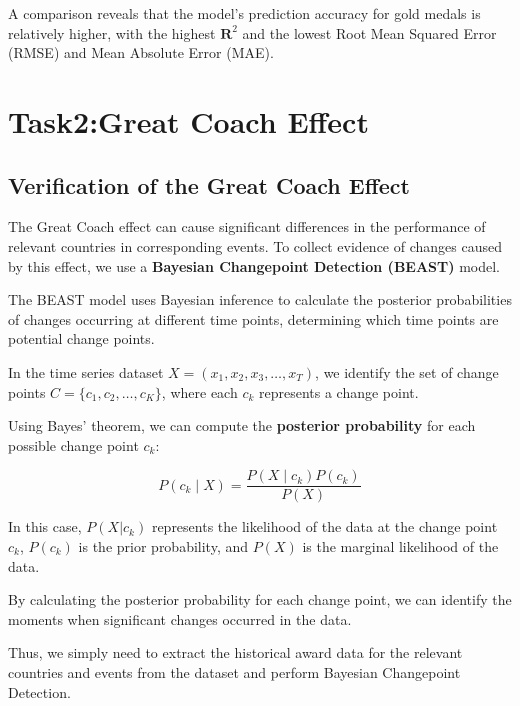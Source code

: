 \documentclass[12pt]{article}  %
\begin{document}
A comparison reveals that the model's prediction accuracy for gold medals is relatively higher, with the highest \(\mathbf{R}^2\) and the lowest Root Mean Squared Error (RMSE) and Mean Absolute Error (MAE).








\section{Task2:Great Coach Effect}
\subsection{Verification of the Great Coach Effect}
The Great Coach effect can cause significant differences in the performance of relevant countries in corresponding events. To collect evidence of changes caused by this effect, we use a \textbf{Bayesian Changepoint Detection (BEAST)} model.

The BEAST model uses Bayesian inference to calculate the posterior probabilities of changes occurring at different time points, determining which time points are potential change points.

In the time series dataset \(X = (x_1, x_2, x_3, \ldots, x_T)\), we identify the set of change points \(C = \{c_1, c_2, \ldots, c_K\}\), where each \(c_k\) represents a change point.

Using Bayes' theorem, we can compute the \textbf{posterior probability} for each possible change point $c_k$:

\begin{equation}
	P(c_k \mid X) = \frac{P(X \mid c_k) P(c_k)}{P(X)}
\end{equation}

In this case, \( P(X|c_k) \) represents the likelihood of the data at the change point \( c_k \), \( P(c_k) \) is the prior probability, and \( P(X) \) is the marginal likelihood of the data.

By calculating the posterior probability for each change point, we can identify the moments when significant changes occurred in the data.

Thus, we simply need to extract the historical award data for the relevant countries and events from the dataset and perform Bayesian Changepoint Detection.
\end{document}
